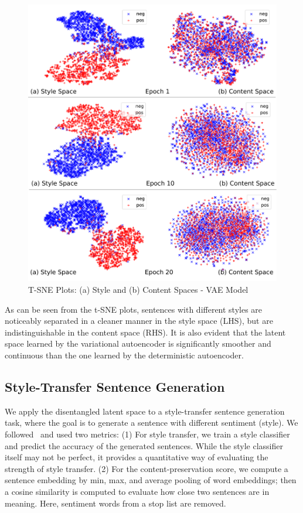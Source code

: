 \documentclass[11pt,a4paper]{article}
\begin{document}
\begin{figure}[ht]
	\includegraphics[width=\linewidth]{latent-spaces-vae}
	\caption{T-SNE Plots: (a) Style and (b) Content Spaces - VAE Model}
	\label{fig:vae-tsne}
\end{figure}

As can be seen from the t-SNE plots, sentences with different styles are noticeably separated in a cleaner manner in the style space (LHS), but are indistinguishable in the content space (RHS). It is also evident that the latent space learned by the variational autoencoder is significantly smoother and continuous than the one learned by the deterministic autoencoder.


\subsection{Style-Transfer Sentence Generation}

We apply the disentangled latent space to a style-transfer sentence generation task, where the goal is to generate a sentence with different sentiment (style). We followed~ and used two metrics: (1) For style transfer, we train a style classifier and predict the accuracy of the generated sentences. While the style classifier itself may not be perfect, it provides a quantitative way of evaluating the strength of style transfer. (2) For the content-preservation score, we compute a sentence embedding by min, max, and average pooling of word embeddings; then a cosine similarity is computed to evaluate how close two sentences are in meaning. Here, sentiment words from a stop list \cite{hu2004mining} are removed.
\end{document}
